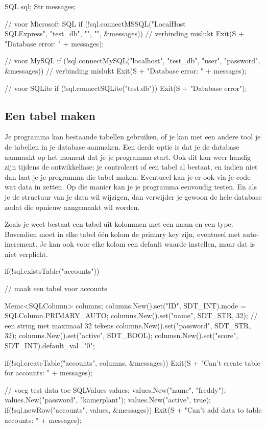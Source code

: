 \begin{code}
SQL sql;
Str messages;

// voor Microsoft SQL
if (!sql.connectMSSQL("LocalHost\\SQLExpress", "test_db", "", "", &messages)) {
  // verbinding mislukt
	Exit(S + "Database error: " + messages);
}

// voor MySQL
if (!sql.connectMySQL("localhost", "test_db", "user", "password", &messages)) {
  // verbinding mislukt
	Exit(S + "Database error: " + messages);
}

// voor SQLite
if (!sql.connectSQLite("test.db")) {
  Exit(S + "Database error");
}
\end{code}

\subsection{Een tabel maken}
Je programma kan bestaande tabellen gebruiken, of je kan met een andere tool je de tabellen in je database aanmaken. Een derde optie is dat je de database aanmaakt op het moment dat je je programma start. Ook dit kan weer handig zijn tijdens de ontwikkelfase: je controleert of een tabel al bestaat, en indien niet dan laat je je programma die tabel maken. Eventueel kan je er ook via je code wat data in zetten. Op die manier kan je je programma eenvoudig testen. En als je de structuur van je data wil wijzigen, dan verwijder je gewoon de hele database zodat die opnieuw aangemaakt wil worden.

Zoals je weet bestaat een tabel uit kolommen met een naam en een type. Bovendien moet in elke tabel \'e\'en kolom de primary key zijn, eventueel met auto-increment. Je kan ook voor elke kolom een default waarde instellen, maar dat is niet verplicht.

\begin{code}
if(!sql.existsTable("accounts")) {
  // maak een tabel voor accounts
	
	Memc<SQLColumn> columns;
	columns.New().set("ID", SDT_INT).mode = SQLColumn.PRIMARY_AUTO;
	columns.New().set("name", SDT_STR, 32); // een string met maximaal 32 tekens
	columns.New().set("password", SDT_STR, 32);
	columns.New().set("active", SDT_BOOL);
	columsn.New().set("score", SDT_INT).default_val="0";
	
	if(!sql.createTable("accounts", columns, &messages)) {
	  Exit(S + "Can't create table for accounts: \n" + messages);
	}
	
	// voeg test data toe
	SQLValues values;
	values.New("name", "freddy");
	values.New("password", "kamerplant");
	values.New("active", true);
	if(!sql.newRow("accounts", values, &messages)) {
	  Exit(S + "Can't add data to table accounts: \n" + messages);
	}
}
\end{code}

